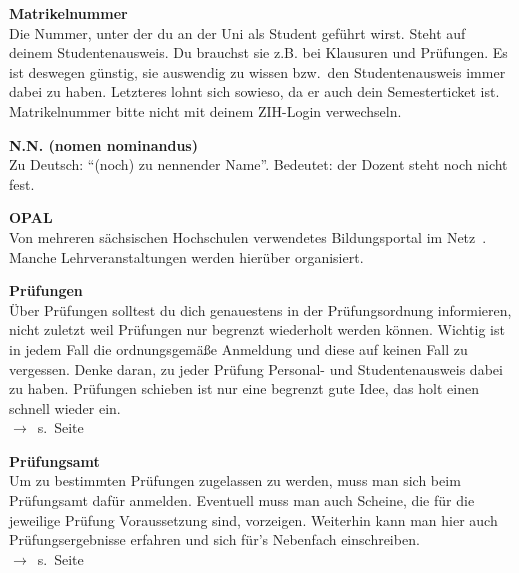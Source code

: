 \begin{multicols}{2}
\textbf{Matrikelnummer} \\
Die Nummer, unter der du an der Uni als Student geführt wirst.
Steht auf deinem Studentenausweis.
Du brauchst sie z.B. bei Klausuren und Prüfungen.
Es ist deswegen günstig, sie auswendig zu wissen bzw.\ den Studentenausweis immer dabei zu haben.
Letzteres lohnt sich sowieso, da er auch dein Semesterticket ist.
Matrikelnummer bitte nicht mit deinem ZIH-Login verwechseln.


\textbf{N.N. (nomen nominandus)} \\
Zu Deutsch:
\enquote{(noch) zu nennender Name}.
Bedeutet:
der Dozent steht noch nicht fest.

\textbf{OPAL}\\
Von mehreren sächsischen Hochschulen verwendetes Bildungsportal im Netz~.
Manche Lehrveranstaltungen werden hierüber organisiert.

\textbf{Prüfungen} \\
Über Prüfungen solltest du dich genauestens in der Prüfungsordnung informieren, nicht zuletzt weil Prüfungen nur begrenzt wiederholt werden können.
Wichtig ist in jedem Fall die ordnungsgemäße Anmeldung und diese auf keinen Fall zu vergessen.
Denke daran, zu jeder Prüfung Personal- und Studentenausweis dabei zu haben.
Prüfungen schieben ist nur eine begrenzt gute Idee, das holt einen schnell wieder ein.\\
$\rightarrow$~s.~Seite~\pageref{sec:pruefungen}

\textbf{Prüfungsamt} \\
Um zu bestimmten Prüfungen zugelassen zu werden, muss man sich beim Prüfungsamt dafür anmelden.
Eventuell muss man auch Scheine, die für die jeweilige Prüfung Voraussetzung sind, vorzeigen.
Weiterhin kann man hier auch Prüfungsergebnisse erfahren und sich für's Nebenfach einschreiben. \\
$\rightarrow$~s.~Seite~\pageref{sec:pruefungsamt}


\end{multicols}
